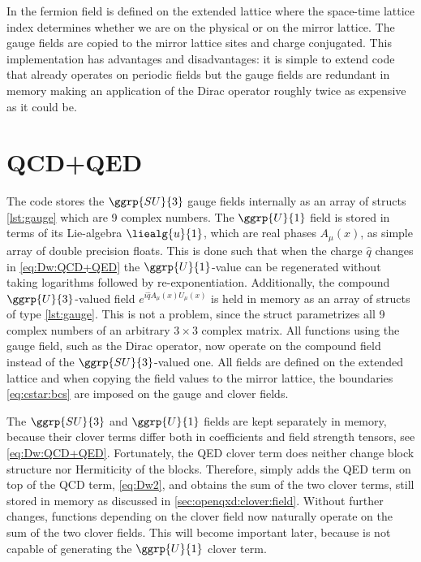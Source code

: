 In \openqxd the fermion field is defined on the extended lattice where the space-time lattice index determines whether we are on the physical or on the mirror lattice.
The gauge fields are copied to the mirror lattice sites and charge conjugated.
This implementation has advantages and disadvantages:
it is simple to extend code that already operates on periodic fields but the gauge fields are redundant in memory making an application of the Dirac operator roughly twice as expensive as it could be. %

\section{QCD+QED}
\label{sec:openqxd:qcd+qed}

The code stores the $\ggrp{SU}{3}$ gauge fields internally as an array of structs \cref{lst:gauge} which are \num{9} complex numbers.
The $\ggrp{U}{1}$ field is stored in terms of its Lie-algebra $\liealg{u}{1}$, which are real phases $A_{\mu}(x)$, as simple array of double precision floats.
This is done such that when the charge $\hat{q}$ changes in \cref{eq:Dw:QCD+QED} the $\ggrp{U}{1}$-value can be regenerated without taking logarithms followed by re-exponentiation.
Additionally, the compound $\ggrp{U}{3}$-valued field $e^{i \hat{q} A_{\mu}(x) U_{\mu}(x)}$ is held in memory as an array of structs of type \cref{lst:gauge}.
This is not a problem, since the  struct parametrizes all \num{9} complex numbers of an arbitrary $3 \times 3$ complex matrix.
All functions using the gauge field, such as the Dirac operator, now operate on the compound field instead of the $\ggrp{SU}{3}$-valued one.
All fields are defined on the extended lattice and when copying the field values to the mirror lattice, the boundaries \cref{eq:cstar:bcs} are imposed on the gauge and clover fields.

The $\ggrp{SU}{3}$ and $\ggrp{U}{1}$ fields are kept separately in memory, because their clover terms differ both in coefficients and field strength tensors, see \cref{eq:Dw:QCD+QED}.
Fortunately, the QED clover term does neither change block structure nor Hermiticity of the blocks.
Therefore, \openqxd simply adds the QED term on top of the QCD term, \cref{eq:Dw2}, and obtains the sum of the two clover terms, still stored in memory as discussed in \cref{sec:openqxd:clover:field}.
Without further changes, functions depending on the clover field now naturally operate on the sum of the two clover fields.
This will become important later, because \quda is not capable of generating the $\ggrp{U}{1}$ clover term.

